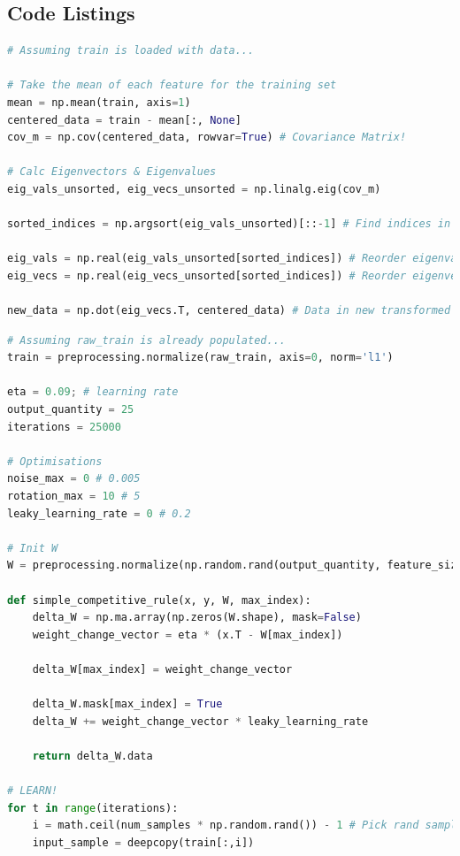 \documentclass[11pt,journal,transmag,final]{IEEEtran}
\begin{document}
\onecolumn
    \begin{appendices}
        \section{Code Listings}
        \begin{lstlisting}[language=Python, caption=Principal Component Analysis Code, basicstyle=\footnotesize, label=code:pca]
# Assuming train is loaded with data...

# Take the mean of each feature for the training set
mean = np.mean(train, axis=1)
centered_data = train - mean[:, None]
cov_m = np.cov(centered_data, rowvar=True) # Covariance Matrix!

# Calc Eigenvectors & Eigenvalues
eig_vals_unsorted, eig_vecs_unsorted = np.linalg.eig(cov_m)

sorted_indices = np.argsort(eig_vals_unsorted)[::-1] # Find indices in dec order

eig_vals = np.real(eig_vals_unsorted[sorted_indices]) # Reorder eigenvalues
eig_vecs = np.real(eig_vecs_unsorted[sorted_indices]) # Reorder eigenvectors
    
new_data = np.dot(eig_vecs.T, centered_data) # Data in new transformed space
        \end{lstlisting}

        \begin{lstlisting}[language=Python, caption=Competitive Learning Code, basicstyle=\footnotesize, label=code:nn]
# Assuming raw_train is already populated...
train = preprocessing.normalize(raw_train, axis=0, norm='l1')

eta = 0.09; # learning rate
output_quantity = 25
iterations = 25000

# Optimisations
noise_max = 0 # 0.005
rotation_max = 10 # 5
leaky_learning_rate = 0 # 0.2

# Init W
W = preprocessing.normalize(np.random.rand(output_quantity, feature_size), axis=0, norm='l1')

def simple_competitive_rule(x, y, W, max_index):
    delta_W = np.ma.array(np.zeros(W.shape), mask=False)
    weight_change_vector = eta * (x.T - W[max_index])
    
    delta_W[max_index] = weight_change_vector
    
    delta_W.mask[max_index] = True
    delta_W += weight_change_vector * leaky_learning_rate
    
    return delta_W.data

# LEARN!
for t in range(iterations):
    i = math.ceil(num_samples * np.random.rand()) - 1 # Pick rand sample
    input_sample = deepcopy(train[:,i])
    

\end{lstlisting}
\end{appendices}
\end{document}

